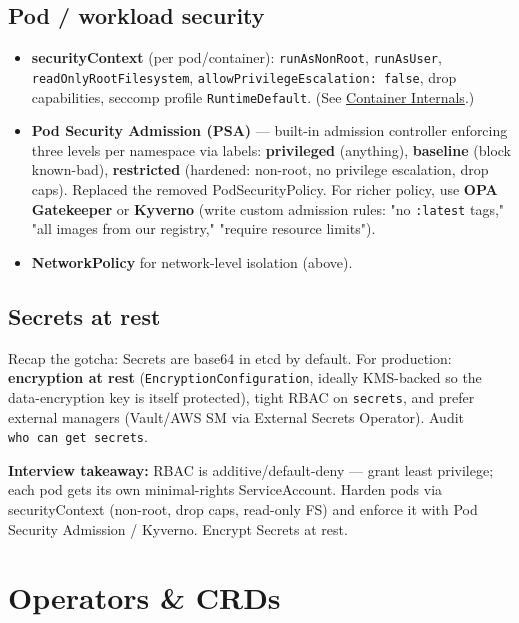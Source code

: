 \documentclass[11pt]{article}
\providecommand{\tightlist}{\setlength{\itemsep}{1pt}\setlength{\parskip}{0pt}}
\begin{document}
\subsection{Pod / workload security}\label{pod--workload-security}

\begin{itemize}
\tightlist
\item
  \textbf{securityContext} (per pod/container): \texttt{runAsNonRoot}, \texttt{runAsUser}, \texttt{readOnlyRootFilesystem}, \texttt{allowPrivilegeEscalation:\ false}, drop capabilities, seccomp profile \texttt{RuntimeDefault}. (See \hyperref[container-internals-namespaces--cgroups]{Container Internals}.)
\item
  \textbf{Pod Security Admission (PSA)} --- built-in admission controller enforcing three levels per namespace via labels: \textbf{privileged} (anything), \textbf{baseline} (block known-bad), \textbf{restricted} (hardened: non-root, no privilege escalation, drop caps). Replaced the removed PodSecurityPolicy. For richer policy, use \textbf{OPA Gatekeeper} or \textbf{Kyverno} (write custom admission rules: "no \texttt{:latest} tags," "all images from our registry," "require resource limits").
\item
  \textbf{NetworkPolicy} for network-level isolation (above).
\end{itemize}

\subsection{Secrets at rest}\label{secrets-at-rest}

Recap the gotcha: Secrets are base64 in etcd by default. For production: \textbf{encryption at rest} (\texttt{EncryptionConfiguration}, ideally KMS-backed so the data-encryption key is itself protected), tight RBAC on \texttt{secrets}, and prefer external managers (Vault/AWS SM via External Secrets Operator). Audit \texttt{who\ can\ get\ secrets}.

\textbf{Interview takeaway:} RBAC is additive/default-deny --- grant least privilege; each pod gets its own minimal-rights ServiceAccount. Harden pods via securityContext (non-root, drop caps, read-only FS) and enforce it with Pod Security Admission / Kyverno. Encrypt Secrets at rest.

\section{Operators \& CRDs}\label{operators--crds}
\end{document}
